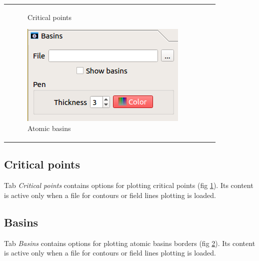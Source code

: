\documentclass[10pt]{article}
\begin{document}
\begin{tabular}{lcr}
\begin{minipage}{.3\linewidth}
\begin{figure}[H]
\begin{center}
    \end{center}
    \vspace*{2mm}
    \caption{Critical points \label{fig:3_7}}
\end{figure}
\end{minipage}
\begin{minipage}{.3\linewidth}
\begin{figure}[H]
    \begin{center}
        \includegraphics[width=0.9\linewidth]{damqt_fig_3_8.png}
    \end{center}
    \vspace*{10mm}
    \caption{Atomic basins \label{fig:3_8}}
\end{figure}
\end{minipage}
\end{tabular}



\subsection{Critical points \label{sec:3.5}}

Tab {\it Critical points} contains options
for plotting critical points (fig \ref{fig:3_7}). Its content is active only when a file for contours
or field lines plotting is loaded. 

\subsection{Basins \label{sec:3.6}}

Tab {\it Basins} contains options
for plotting atomic basins borders (fig \ref{fig:3_8}). Its content is active only when a file for contours
or field lines plotting is loaded. 
\end{document}
